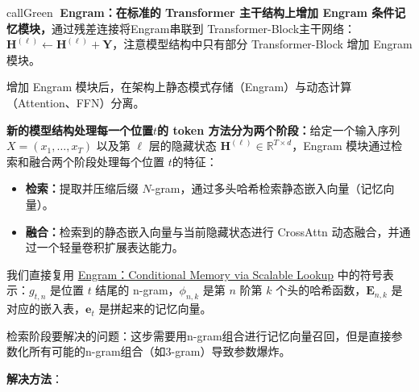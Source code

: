 \documentclass[zihao=false,fontset=windows]{ctexart}
\begin{document}
\begin{feishubox}{callGreen}{🧭}
\textcolor{feishuRed}{\textbf{Engram：在标准的 Transformer 主干结构上增加 Engram 条件记忆模块，}}通过残差连接将Engram串联到 Transformer-Block主干网络：$\mathbf H^{(\ell)}\leftarrow\mathbf H^{(\ell)}+\mathbf Y$，\textcolor{feishuRed}{注意模型结构中只有部分 Transformer-Block 增加 Engram 模块。}

增加 Engram 模块后，在架构上静态模式存储（Engram）与动态计算（Attention、FFN）分离。

\textcolor{feishuRed}{\textbf{新的模型结构处理每一个位置}}$t$\textcolor{feishuRed}{\textbf{的 token 方法分为两个阶段：}}给定一个输入序列 $X=(x_1,\ldots,x_T)$ 以及第 $\ell$ 层的隐藏状态 $\mathbf H^{(\ell)}\in\mathbb R^{T\times d}$，Engram\textcolor{feishuRed}{\textbf{ }}模块通过\textcolor{feishuRed}{检索和融合两个阶段}处理每个位置 $t$的特征：

\begin{itemize}
\item \textbf{检索：}提取并压缩后缀 $N$-gram，通过多头哈希检索静态嵌入向量（记忆向量）。
\item \textbf{融合：}检索到的静态嵌入向量与当前隐藏状态进行 CrossAttn 动态融合，并通过一个轻量卷积扩展表达能力。
\end{itemize}
\end{feishubox}
我们直接复用 \href{https://my.feishu.cn/wiki/JwXTw0oUeimyoBk2QIgcSfBfn9g}{Engram：Conditional Memory via Scalable Lookup} 中的符号表示：$g_{t,n}$ 是位置 $t$ 结尾的 n-gram，$\phi_{n,k}$ 是第 $n$ 阶第 $k$ 个头的哈希函数，$\mathbf E_{n,k}$ 是对应的嵌入表，$\mathbf e_t$ 是拼起来的记忆向量。

检索阶段要解决的问题：这步需要用n-gram组合进行记忆向量召回，但是直接参数化所有可能的n-gram组合（如3-gram）导致参数爆炸。

\textbf{解决方法}：
\end{document}
